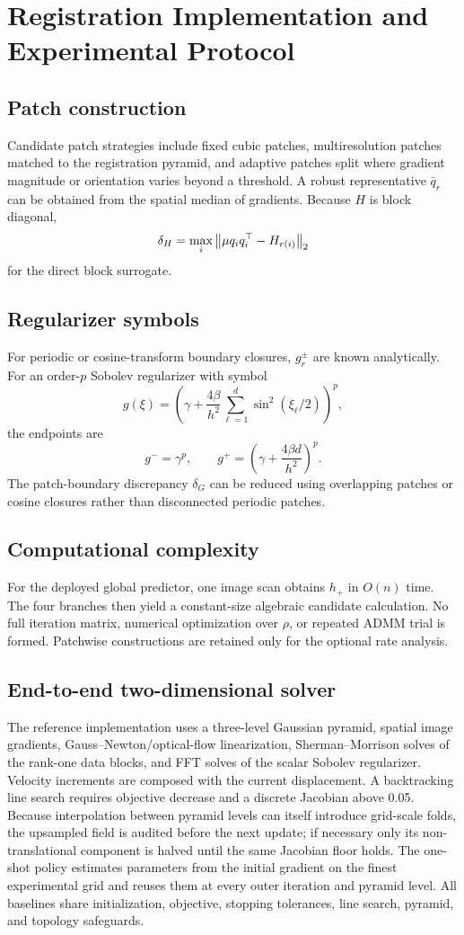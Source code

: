 \documentclass[pdflatex,iicol,sn-mathphys-num]{sn-jnl}
\theoremstyle{definition}\newtheorem{definition}[theorem]{Definition}\newtheorem{remark}[theorem]{Remark}
\begin{document}
\section{Registration Implementation and Experimental Protocol}
\subsection{Patch construction}
Candidate patch strategies include fixed cubic patches, multiresolution patches matched to the registration pyramid, and adaptive patches split where gradient magnitude or orientation varies beyond a threshold. A robust representative $\bar q_r$ can be obtained from the spatial median of gradients. Because $H$ is block diagonal,
\[
\delta_H
=\max_i\left\lVert \mu q_iq_i^\top-H_{r(i)}\right\rVert_2
\]
for the direct block surrogate.

\subsection{Regularizer symbols}
For periodic or cosine-transform boundary closures, $g_r^\pm$ are known analytically. For an order-$p$ Sobolev regularizer with symbol
\[
g(\xi)=\left(\gamma+\frac{4\beta}{h^2}\sum_{\ell=1}^d\sin^2(\xi_\ell/2)\right)^p,
\]
the endpoints are
\[
g^- = \gamma^p,
\qquad
g^+=\left(\gamma+\frac{4\beta d}{h^2}\right)^p.
\]
The patch-boundary discrepancy $\delta_G$ can be reduced using overlapping patches or cosine closures rather than disconnected periodic patches.

\subsection{Computational complexity}
For the deployed global predictor, one image scan obtains $h_+$ in $O(n)$ time. The four branches then yield a constant-size algebraic candidate calculation. No full iteration matrix, numerical optimization over $\rho$, or repeated ADMM trial is formed. Patchwise constructions are retained only for the optional rate analysis.

\subsection{End-to-end two-dimensional solver}
The reference implementation uses a three-level Gaussian pyramid, spatial image
gradients, Gauss--Newton/optical-flow linearization, Sherman--Morrison solves of
the rank-one data blocks, and FFT solves of the scalar Sobolev regularizer.
Velocity increments are composed with the current displacement.  A backtracking
line search requires objective decrease and a discrete Jacobian above 0.05.
Because interpolation between pyramid levels can itself introduce grid-scale
folds, the upsampled field is audited before the next update; if necessary only
its non-translational component is halved until the same Jacobian floor holds.
The one-shot policy estimates parameters from the initial gradient on the
finest experimental grid and reuses them at every outer iteration and pyramid level.  All
baselines share initialization, objective, stopping tolerances, line search,
pyramid, and topology safeguards.
\end{document}
